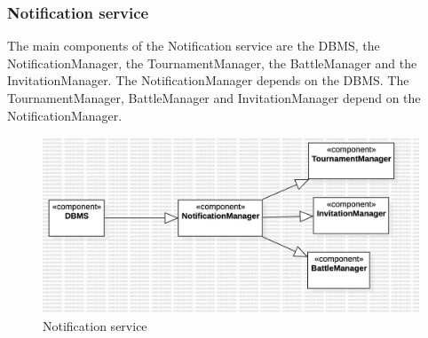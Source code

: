 \subsubsection*{Notification service}
The main components of the Notification service are the DBMS, the NotificationManager, the TournamentManager, the BattleManager and the InvitationManager. The NotificationManager depends on the DBMS. The TournamentManager, BattleManager and InvitationManager depend on the NotificationManager.
\begin{figure}[H]
    \centering
    \includegraphics[width=\textwidth]{Diagrams/NotificationIntegrationPlan.jpg}
    \caption{Notification service}
    \label{fig:notification}
\end{figure}


